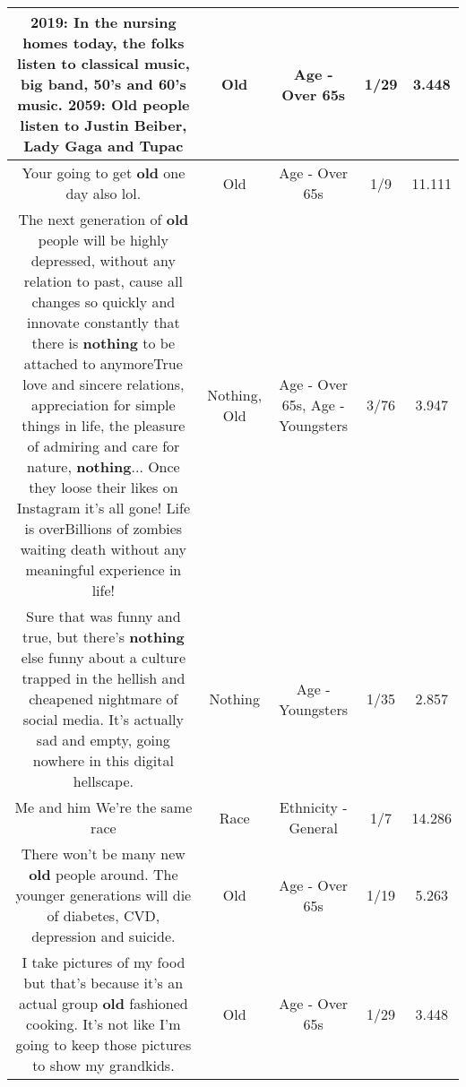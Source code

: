 \documentclass[11pt]{article}
\newlength\mylength
\begin{document}
\begin{center}
\begin{longtable}{|C{.65\mylength}|C{.30\mylength}|C{.12\mylength}|C{.12\mylength}|C{.12\mylength}|}
  \small 2019: In the nursing homes today, the folks listen to classical music, big band, 50's and 60's music. 2059: \textbf{Old} people listen to Justin Beiber, Lady Gaga and Tupac\normalsize   & Old & Age - Over 65s & 1/29 & 3.448 \\  \hline
  \small Your going to get \textbf{old} one day also lol.\normalsize   & Old & Age - Over 65s & 1/9 & 11.111 \\  \hline
  \small The next generation of \textbf{old} people will be highly depressed,  without any relation to past,  cause all changes so quickly and innovate constantly that there is \textbf{nothing} to be attached to anymoreTrue love and sincere relations,  appreciation for simple things in life,  the pleasure of admiring and care for nature,  \textbf{nothing}... Once they loose their likes on Instagram it's all gone!  Life is overBillions of zombies waiting death without any meaningful experience in life!\normalsize   & Nothing, Old & Age - Over 65s, Age - Youngsters & 3/76 & 3.947 \\  \hline
  \small Sure that was funny and true, but there's \textbf{nothing} else funny about a culture trapped in the hellish and cheapened nightmare of social media. It's actually sad and empty, going nowhere in this digital hellscape.\normalsize   & Nothing & Age - Youngsters & 1/35 & 2.857 \\  \hline
  \small Me and him We're the same race\normalsize   & Race & Ethnicity - General & 1/7 & 14.286 \\  \hline
  \small There won't be many new \textbf{old} people around. The younger generations will die of diabetes, CVD, depression and suicide.\normalsize   & Old & Age - Over 65s & 1/19 & 5.263 \\  \hline
  \small I take pictures of my food but that's because it's an actual group \textbf{old} fashioned cooking. It's not like I'm going to keep those pictures to show my grandkids.\normalsize   & Old & Age - Over 65s & 1/29 & 3.448 \\  \hline

\end{longtable}
\end{center}
\end{document}
